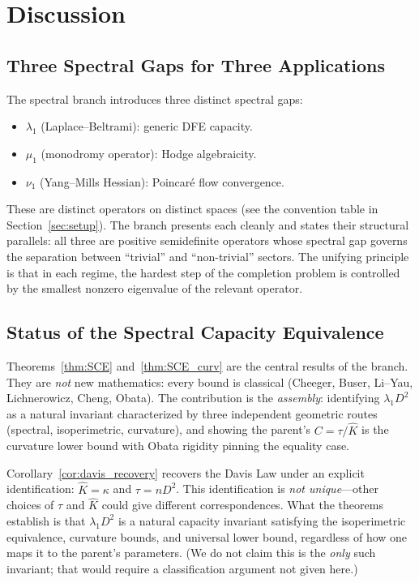 \documentclass[11pt]{article}
\theoremstyle{definition}
\theoremstyle{remark}
\begin{document}
\section{Discussion}
\label{sec:discussion}

\subsection{Three Spectral Gaps for Three Applications}

The spectral branch introduces three distinct spectral gaps:
\begin{itemize}[nosep]
\item $\lambda_1$ (Laplace--Beltrami): generic DFE capacity.
\item $\mu_1$ (monodromy operator): Hodge algebraicity.
\item $\nu_1$ (Yang--Mills Hessian): Poincar\'{e} flow convergence.
\end{itemize}
These are distinct operators on distinct spaces (see the convention table in Section~\ref{sec:setup}). The branch presents each cleanly and states their structural parallels: all three are positive semidefinite operators whose spectral gap governs the separation between ``trivial'' and ``non-trivial'' sectors. The unifying principle is that in each regime, the hardest step of the completion problem is controlled by the smallest nonzero eigenvalue of the relevant operator.

\subsection{Status of the Spectral Capacity Equivalence}

Theorems~\ref{thm:SCE} and~\ref{thm:SCE_curv} are the central results of the branch. They are \emph{not} new mathematics: every bound is classical (Cheeger, Buser, Li--Yau, Lichnerowicz, Cheng, Obata). The contribution is the \emph{assembly}: identifying $\lambda_1 D^2$ as a natural invariant characterized by three independent geometric routes (spectral, isoperimetric, curvature), and showing the parent's $C = \tau/\hat{K}$ is the curvature lower bound with Obata rigidity pinning the equality case.

Corollary~\ref{cor:davis_recovery} recovers the Davis Law under an explicit identification: $\hat{K} = \kappa$ and $\tau = nD^2$. This identification is \emph{not unique}---other choices of $\tau$ and $\hat{K}$ could give different correspondences. What the theorems establish is that $\lambda_1 D^2$ is a natural capacity invariant satisfying the isoperimetric equivalence, curvature bounds, and universal lower bound, regardless of how one maps it to the parent's parameters. (We do not claim this is the \emph{only} such invariant; that would require a classification argument not given here.)
\end{document}

